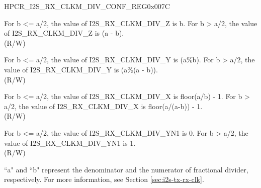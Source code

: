 \begin{register}{H}{PCR\_I2S\_RX\_CLKM\_DIV\_CONF\_REG}{0x007C}\label{regdesc:PCRI2SRXCLKMDIVCONFREG}
%
%
%
%
%
\regnewline%
\begin{regdesc}\begin{reglist}
\label{fielddesc:PCRI2SRXCLKMDIVZ}\item [PCR\_I2S\_RX\_CLKM\_DIV\_Z] For b <= a/2, the value of I2S\_RX\_CLKM\_DIV\_Z is b. For b > a/2, the value of I2S\_RX\_CLKM\_DIV\_Z is (a - b). \\ (R/W)
\label{fielddesc:PCRI2SRXCLKMDIVY}\item [PCR\_I2S\_RX\_CLKM\_DIV\_Y] For b <= a/2, the value of I2S\_RX\_CLKM\_DIV\_Y is (a\%b). For b > a/2, the value of I2S\_RX\_CLKM\_DIV\_Y is (a\%(a - b)). \\ (R/W)
\label{fielddesc:PCRI2SRXCLKMDIVX}\item [PCR\_I2S\_RX\_CLKM\_DIV\_X] For b <= a/2, the value of I2S\_RX\_CLKM\_DIV\_X is floor(a/b) - 1. For b > a/2, the value of I2S\_RX\_CLKM\_DIV\_X is floor(a/(a-b)) - 1. \\ (R/W)
\label{fielddesc:PCRI2SRXCLKMDIVYN1}\item [PCR\_I2S\_RX\_CLKM\_DIV\_YN1] For b <= a/2, the value of I2S\_RX\_CLKM\_DIV\_YN1 is 0. For b > a/2, the value of I2S\_RX\_CLKM\_DIV\_YN1 is 1. \\ (R/W)
\end{reglist}\end{regdesc}
\vspace{-2em}
\begin{tiplisting}
``a" and ``b" represent the denominator and the numerator of fractional divider, respectively. For more information, see Section \ref{sec:i2s-tx-rx-clk}.
\end{tiplisting}
\end{register}





